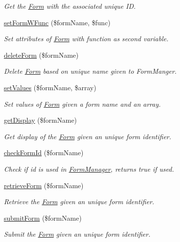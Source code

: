 \begin{DoxyCompactItemize}
\begin{DoxyCompactList}\small\item\em Get the \hyperlink{class_form}{Form} with the associated unique I\-D. \end{DoxyCompactList}\item 
\hyperlink{class_form_manager_a7e78d524604f6922a0a8a580fc1ee581}{set\-Form\-W\-Func} (\$form\-Name, \$func)
\begin{DoxyCompactList}\small\item\em Set attributes of \hyperlink{class_form}{Form} with function as second variable. \end{DoxyCompactList}\item 
\hyperlink{class_form_manager_af061bdc8e3df0a4efc0d3a56a78f1f2d}{delete\-Form} (\$form\-Name)
\begin{DoxyCompactList}\small\item\em Delete \hyperlink{class_form}{Form} based on unique name given to Form\-Manger. \end{DoxyCompactList}\item 
\hyperlink{class_form_manager_ab62c8f00f2c8a2f290ad7fb4dfd9dc4b}{set\-Values} (\$form\-Name, \$array)
\begin{DoxyCompactList}\small\item\em Set values of \hyperlink{class_form}{Form} given a form name and an array. \end{DoxyCompactList}\item 
\hyperlink{class_form_manager_a321cea2eb6ffee3583138f24e27b6cd8}{get\-Display} (\$form\-Name)
\begin{DoxyCompactList}\small\item\em Get display of the \hyperlink{class_form}{Form} given an unique form identifier. \end{DoxyCompactList}\item 
\hypertarget{class_form_manager_a5f810d1803120942c114e4b5d9cd093d}{\hyperlink{class_form_manager_a5f810d1803120942c114e4b5d9cd093d}{check\-Form\-Id} (\$form\-Name)}\label{class_form_manager_a5f810d1803120942c114e4b5d9cd093d}

\begin{DoxyCompactList}\small\item\em Check if id is used in \hyperlink{class_form_manager}{Form\-Manager}, returns true if used. \end{DoxyCompactList}\item 
\hyperlink{class_form_manager_a522aad29e6a35bb37a5af7e97588c70e}{retrieve\-Form} (\$form\-Name)
\begin{DoxyCompactList}\small\item\em Retrieve the \hyperlink{class_form}{Form} given an unique form identifier. \end{DoxyCompactList}\item 
\hyperlink{class_form_manager_aac5abede82f76aac05ab405be136871d}{submit\-Form} (\$form\-Name)
\begin{DoxyCompactList}\small\item\em Submit the \hyperlink{class_form}{Form} given an unique form identifier. \end{DoxyCompactList}\end{DoxyCompactItemize}
